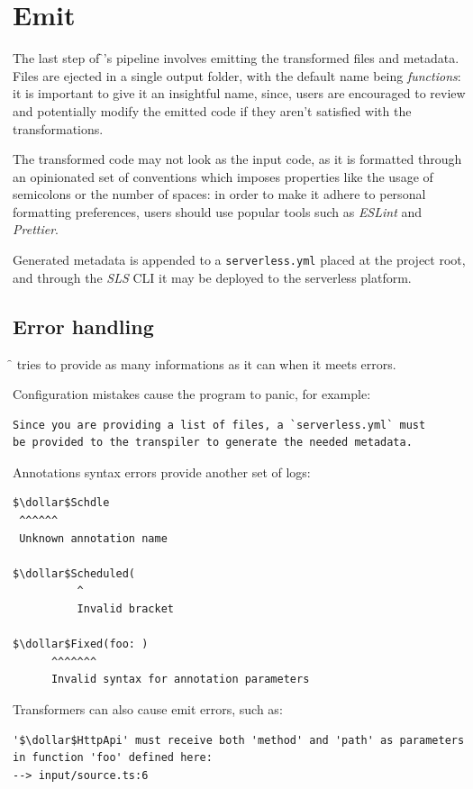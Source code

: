 \section{Emit}

The last step of \f{}'s pipeline involves emitting the transformed files and metadata.
Files are ejected in a single output folder,
with the default name being \textit{functions}: it is important to give it an insightful name,
since, users are encouraged to review and potentially modify the emitted code
if they aren't satisfied with the transformations.

The transformed code may not look as the input code, as it is formatted
through an opinionated set of conventions which imposes properties like
the usage of semicolons or the number of spaces:
in order to make it adhere to personal formatting preferences,
users should use popular tools such as \textit{ESLint} and \textit{Prettier}.

Generated metadata is appended to a \verb|serverless.yml| placed at the project root,
and through the \textit{SLS} CLI it may be deployed to the serverless platform.

\subsection{Error handling}

\f{} tries to provide as many informations as it can when it meets errors.

Configuration mistakes cause the program to panic, for example:
\begin{lstlisting}[language=console]
Since you are providing a list of files, a `serverless.yml` must
be provided to the transpiler to generate the needed metadata.
\end{lstlisting}

Annotations syntax errors provide another set of logs:
\begin{lstlisting}[language=console]
$\dollar$Schdle
 ^^^^^^
 Unknown annotation name

$\dollar$Scheduled(
          ^
          Invalid bracket

$\dollar$Fixed(foo: )
      ^^^^^^^
      Invalid syntax for annotation parameters
\end{lstlisting}

Transformers can also cause emit errors, such as:
\begin{lstlisting}[language=console]
'$\dollar$HttpApi' must receive both 'method' and 'path' as parameters
in function 'foo' defined here:
--> input/source.ts:6
\end{lstlisting}
